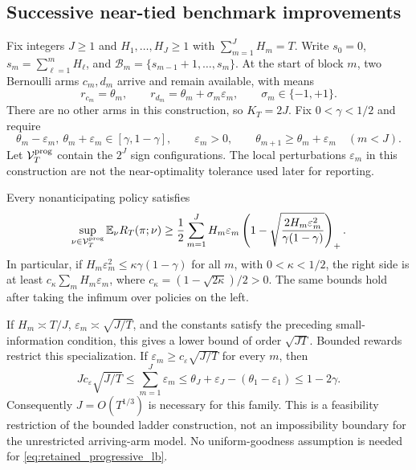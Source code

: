 \documentclass[11pt]{article}
\begin{document}
\subsection{Successive near-tied benchmark improvements}

Fix integers $J\ge1$ and $H_1,\ldots,H_J\ge1$ with
$\sum_{m=1}^JH_m=T$. Write $s_0=0$,
$s_m=\sum_{\ell=1}^mH_\ell$, and
$\mathcal B_m=\{s_{m-1}+1,\ldots,s_m\}$. At the start of block $m$,
two Bernoulli arms $c_m,d_m$ arrive and remain available, with means
\[
 r_{c_m}=\theta_m,\qquad
 r_{d_m}=\theta_m+\sigma_m\varepsilon_m,
 \qquad \sigma_m\in\{-1,+1\}.
\]
There are no other arms in this construction, so $K_T=2J$. Fix
$0<\gamma<1/2$ and require
\begin{equation}
 \theta_m-\varepsilon_m,\ \theta_m+\varepsilon_m
       \in[\gamma,1-\gamma],\qquad \varepsilon_m>0,
 \qquad
 \theta_{m+1}\ge\theta_m+\varepsilon_m\quad(m<J).
 \label{eq:retained_progressive_parameters}
\end{equation}
Let $\mathcal V_T^{\rm prog}$ contain the $2^J$ sign configurations.
The local perturbations $\varepsilon_m$ in this construction are not the
near-optimality tolerance used later for reporting.

\begin{theorem}
\label{thm:retained_progressive}
Every nonanticipating policy satisfies
\begin{equation}
 \sup_{\nu\in\mathcal V_T^{\rm prog}}\mathbb E_\nu R_T(\pi;\nu)
 \ge\frac12\sum_{m=1}^JH_m\varepsilon_m
       \left(1-\sqrt{\frac{2H_m\varepsilon_m^2}
                                {\gamma(1-\gamma)}}\right)_+.
 \label{eq:retained_progressive_lb}
\end{equation}
In particular, if $H_m\varepsilon_m^2\le\kappa\gamma(1-\gamma)$ for all
$m$, with $0<\kappa<1/2$, the right side is at least
$c_\kappa\sum_m H_m\varepsilon_m$, where
$c_\kappa=(1-\sqrt{2\kappa})/2>0$. The same bounds hold after taking the
infimum over policies on the left.
\end{theorem}

If $H_m\asymp T/J$, $\varepsilon_m\asymp\sqrt{J/T}$, and the constants
satisfy the preceding small-information condition, this gives a lower bound
of order $\sqrt{JT}$. Bounded rewards restrict this specialization. If
$\varepsilon_m\ge c_\varepsilon\sqrt{J/T}$ for every $m$, then
\[
 Jc_\varepsilon\sqrt{J/T}
 \le \sum_{m=1}^J\varepsilon_m
 \le \theta_J+\varepsilon_J-(\theta_1-\varepsilon_1)
 \le1-2\gamma.
\]
Consequently $J=O(T^{1/3})$ is necessary for this family. This is a
feasibility restriction of the bounded ladder construction, not an
impossibility boundary for the unrestricted arriving-arm model. No
uniform-goodness assumption is needed for
\eqref{eq:retained_progressive_lb}. \suppproof
\end{document}
